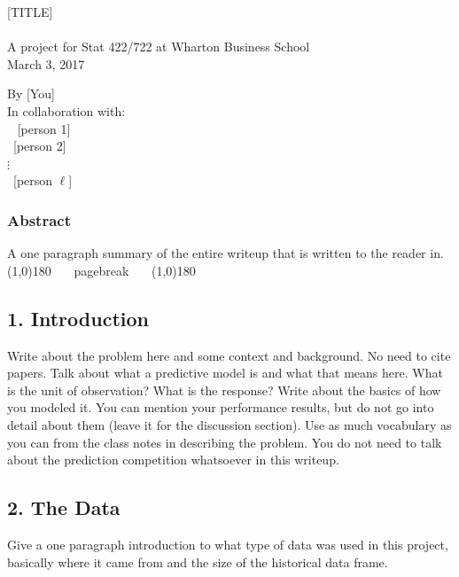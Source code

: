 \documentclass[12pt]{article}
\begin{document}
\begin{tcolorbox}

\begin{center}
[TITLE]\\~\\
\footnotesize A project for Stat 422/722 at Wharton Business School\\
March 3, 2017
\end{center}

\begin{flushright}
By [You]\\
In collaboration with:\\
~ [person 1]~\\
~[person 2]~\\
$\vdots$~~~\\
~[person $\ell$]
\end{flushright}

\subsubsection*{Abstract}

A one paragraph summary of the entire writeup that is written to  the reader in.\\

\line(1,0){180} ~~~pagebreak~~~ \line(1,0){180}\\

\subsection*{1. Introduction}

Write about the problem here and some context and background. No need to cite papers. Talk about what a predictive model is and what that means here. What is the unit of observation? What is the response? Write about the basics of how you modeled it. You can mention your performance results, but do not go into detail about them (leave it for the discussion section). Use as much vocabulary as you can from the class notes in describing the problem. You do not need to talk about the prediction competition whatsoever in this writeup.


\subsection*{2. The Data}

Give a one paragraph introduction to what type of data was used in this project, basically where it came from and the size of the historical data frame.


\end{tcolorbox}
\end{document}
